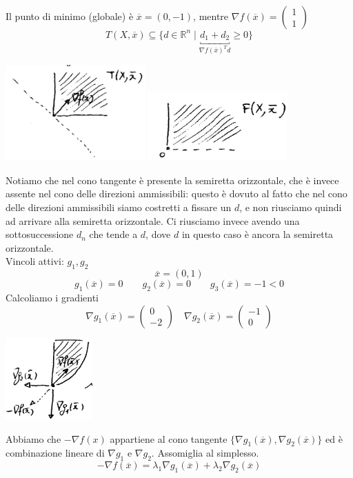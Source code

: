 \begin{example}
Il punto di minimo (globale) \`e $\overline{x}=(0, -1)$, mentre
$\nabla f(\overline{x}) =
\begin{pmatrix}
 1 \\
 1
\end{pmatrix}
$
$$
T(X, \overline{x} ) \subseteq \{d \in \mathbb{R}^{n} \; | \; \underbracket{d_1 + d_2}_{\nabla f(\overline{x})^{T}d} \geq 0 \}
 $$
\begin{center}
\includegraphics[width=0.4\textwidth]{imgs/ottvinc03.png}
\quad
\includegraphics[width=0.4\textwidth]{imgs/ottvinc04.png}
\end{center}
Notiamo che nel cono tangente \`e presente la semiretta orizzontale,
che \`e invece assente nel cono delle direzioni ammissibili: questo \`e
dovuto al fatto che nel cono delle direzioni ammissibili siamo costretti
a fissare un $d$, e non riusciamo quindi ad arrivare alla semiretta orizzontale.
Ci riusciamo invece avendo una sottosuccessione $d_n$ che tende a $d$, dove
$d$ in questo caso \`e ancora la semiretta orizzontale. \\
Vincoli attivi: $g_1, g_2$
$$\overline{x} = (0,1)$$
$$ g_1(\overline{x}) = 0 \qquad
 g_2(\overline{x}) = 0 \qquad
 g_3(\overline{x}) = -1 < 0 $$
Calcoliamo i gradienti
$$ \nabla g_1(\overline{x}) =
\begin{pmatrix}
0 \\
-2
\end{pmatrix}\quad \nabla g_2(\overline{x})=
\begin{pmatrix}
-1 \\
 0
\end{pmatrix}
$$
\begin{center}
\includegraphics[width=0.25\textwidth]{imgs/ottvinc02.png}
\end{center}

Abbiamo che $-\nabla f(x)$ appartiene al cono tangente
 $\{\nabla g_1(\overline{x}),\nabla g_2(\overline{x})\}$
ed \`e combinazione lineare di $\nabla g_1$ e $\nabla g_2$.
Assomiglia al simplesso.
$$ - \nabla f(\overline{x}) = \lambda_1 \nabla g_1(\overline{x}) +
\lambda_2 \nabla g_2(\overline{x}) $$
\end{example}
